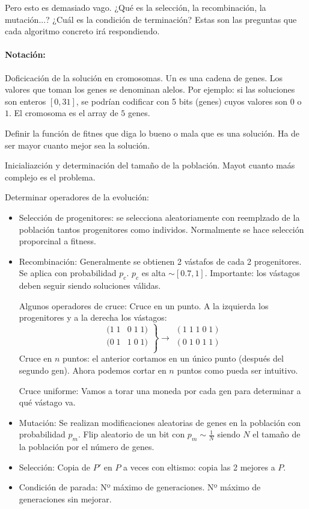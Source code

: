 \documentclass{apuntes}
\begin{document}
Pero esto es demasiado vago. ¿Qué es la selección, la recombinación, la mutación...? ¿Cuál es la condición de terminación? Estas son las preguntas que cada algoritmo concreto irá respondiendo.

\paragraph{Notación:} Doficicación de la solución en cromosomas. Un  es una cadena de genes. Los valores que toman los genes se denominan alelos. Por ejemplo: si las soluciones son enteros $[0,31]$, se podrían codificar con 5 bits (genes) cuyos valores son $0$ o $1$. El cromosoma es el array de $5$ genes.

Definir la función de fitnes que diga lo bueno o mala que es una solución. Ha de ser mayor cuanto mejor sea la solución.

Inicialiazción y determinación del tamaño de la población. Mayot cuanto maás complejo es el problema.

Determinar operadores de la evolución:
\begin{itemize}
	\item Selección de progenitores: se selecciona aleatoriamente con reemplzado de la población tantos progenitores como individos. Normalmente se hace selección proporcinal a fitness.
	\item Recombinación: Generalmente se obtienen 2 vástafos de cada 2 progenitores. Se aplica con probabilidad $p_c$. $p_c$ es alta $\sim [0.7,1]$. Importante: los vástagos deben seguir siendo soluciones válidas.

	Algunos operadores de cruce:
	\subitem Cruce en un punto. A la izquierda los progenitores y a la derecha los vástagos:
	\[
	\left.
	\begin{array}{cc}
	(1 \; 1 & 0 \; 1 \; 1) \\
	(0 \; 1 & 1 \; 0 \; 1) \\
	\end{array}
	\right\} \to \begin{array}{c}
	(1 \; 1 \; 1 \; 0 \; 1) \\
	(0 \; 1 \; 0 \; 1 \; 1) \\
	\end{array}
	\]
	\subitem Cruce en $n$ puntos: el anterior cortamos en un único punto (después del segundo gen). Ahora podemos cortar en $n$ puntos como pueda ser intuitivo.

	\subitem Cruce uniforme: Vamos a torar una moneda por cada gen para determinar a qué vástago va.
	\item Mutación: Se realizan modificaciones aleatorias de genes en la población con probabilidad $p_m$.
	\subitem Flip aleatorio de un bit con $p_m \sim\frac{1}{N}$ siendo $N$ el tamaño de la población por el número de genes.
	\item Selección: Copia de $P'$ en $P$ a veces con eltismo: copia las 2 mejores a $P$.
	\item Condición de parada:
	\subitem Nº máximo de generaciones.
	\subitem Nº máximo de generaciones sin mejorar.
\end{itemize}
\end{document}
